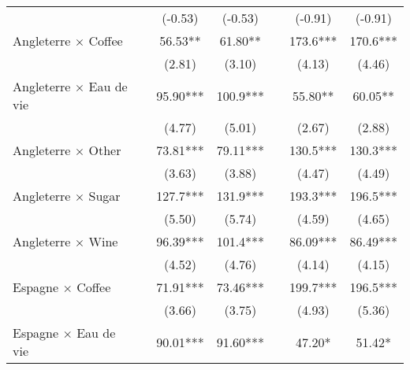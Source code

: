 {\begin{tabular}{l*{6}{c}}
                    &                     &     (-0.53)         &     (-0.53)         &                     &     (-0.91)         &     (-0.91)         \\
[1em]
Angleterre $\times$ Coffee&                     &       56.53** &       61.80** &                     &       173.6***&       170.6***\\
                    &                     &      (2.81)         &      (3.10)         &                     &      (4.13)         &      (4.46)         \\
[1em]
Angleterre $\times$ Eau de vie&                     &       95.90***&       100.9***&                     &       55.80** &       60.05** \\
                    &                     &      (4.77)         &      (5.01)         &                     &      (2.67)         &      (2.88)         \\
[1em]
Angleterre $\times$ Other&                     &       73.81***&       79.11***&                     &       130.5***&       130.3***\\
                    &                     &      (3.63)         &      (3.88)         &                     &      (4.47)         &      (4.49)         \\
[1em]
Angleterre $\times$ Sugar&                     &       127.7***&       131.9***&                     &       193.3***&       196.5***\\
                    &                     &      (5.50)         &      (5.74)         &                     &      (4.59)         &      (4.65)         \\
[1em]
Angleterre $\times$ Wine&                     &       96.39***&       101.4***&                     &       86.09***&       86.49***\\
                    &                     &      (4.52)         &      (4.76)         &                     &      (4.14)         &      (4.15)         \\
[1em]
Espagne $\times$ Coffee&                     &       71.91***&       73.46***&                     &       199.7***&       196.5***\\
                    &                     &      (3.66)         &      (3.75)         &                     &      (4.93)         &      (5.36)         \\
[1em]
Espagne $\times$ Eau de vie&                     &       90.01***&       91.60***&                     &       47.20*  &       51.42*  \\

\end{tabular}}
